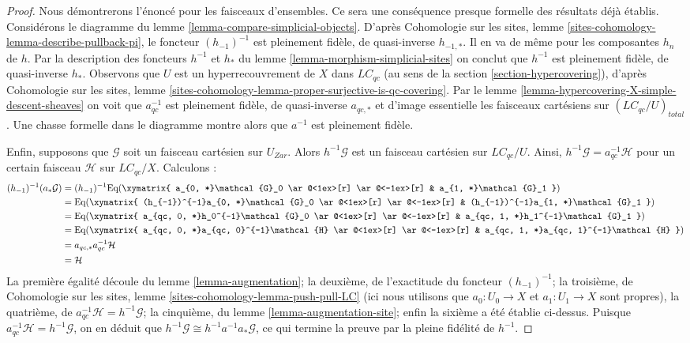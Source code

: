 \begin{proof}
Nous démontrerons l'énoncé pour les faisceaux d'ensembles. Ce sera une
conséquence presque formelle des résultats déjà établis.
Considérons le diagramme du lemme \ref{lemma-compare-simplicial-objects}.
D'après Cohomologie sur les sites, lemme \ref{sites-cohomology-lemma-describe-pullback-pi},
le foncteur $(h_{-1})^{-1}$ est pleinement fidèle, de quasi-inverse $h_{-1, *}$.
Il en va de même pour les composantes $h_n$ de $h$.
Par la description des foncteurs $h^{-1}$ et $h_*$ du lemme
\ref{lemma-morphism-simplicial-sites}
on conclut que $h^{-1}$ est pleinement fidèle, de quasi-inverse $h_*$.
Observons que $U$ est un hyperrecouvrement de $X$ dans $\textit{LC}_{qc}$
(au sens de la section \ref{section-hypercovering}), d'après
Cohomologie sur les sites, lemme
\ref{sites-cohomology-lemma-proper-surjective-is-qc-covering}.
Par le lemme \ref{lemma-hypercovering-X-simple-descent-sheaves}
on voit que $a_{qc}^{-1}$ est pleinement fidèle, de quasi-inverse $a_{qc, *}$
et d'image essentielle les faisceaux cartésiens sur
$(\textit{LC}_{qc}/U)_{total}$.
Une chasse formelle dans le diagramme montre alors que
$a^{-1}$ est pleinement fidèle.

\medskip\noindent
Enfin, supposons que $\mathcal{G}$ soit un faisceau cartésien sur $U_{Zar}$.
Alors $h^{-1}\mathcal{G}$ est un faisceau cartésien sur $\textit{LC}_{qc}/U$.
Ainsi, $h^{-1}\mathcal{G} = a_{qc}^{-1}\mathcal{H}$ pour un certain faisceau
$\mathcal{H}$ sur $\textit{LC}_{qc}/X$.
Calculons :
\begin{align*}
(h_{-1})^{-1}(a_*\mathcal{G})
& =
(h_{-1})^{-1}
\text{Eq}(
\xymatrix{
a_{0, *}\mathcal{G}_0
\ar@<1ex>[r] \ar@<-1ex>[r] &
a_{1, *}\mathcal{G}_1
}
) \\
& =
\text{Eq}(
\xymatrix{
(h_{-1})^{-1}a_{0, *}\mathcal{G}_0
\ar@<1ex>[r] \ar@<-1ex>[r] &
(h_{-1})^{-1}a_{1, *}\mathcal{G}_1
}
) \\
& =
\text{Eq}(
\xymatrix{
a_{qc, 0, *}h_0^{-1}\mathcal{G}_0
\ar@<1ex>[r] \ar@<-1ex>[r] &
a_{qc, 1, *}h_1^{-1}\mathcal{G}_1
}
) \\
& =
\text{Eq}(
\xymatrix{
a_{qc, 0, *}a_{qc, 0}^{-1}\mathcal{H}
\ar@<1ex>[r] \ar@<-1ex>[r] &
a_{qc, 1, *}a_{qc, 1}^{-1}\mathcal{H}
}
) \\
& =
a_{qc, *}a_{qc}^{-1}\mathcal{H} \\
& =
\mathcal{H}
\end{align*}
La première égalité découle du lemme \ref{lemma-augmentation};
la deuxième, de l'exactitude du foncteur $(h_{-1})^{-1}$;
la troisième, de
Cohomologie sur les sites, lemme \ref{sites-cohomology-lemma-push-pull-LC}
(ici nous utilisons que $a_0 : U_0 \to X$ et $a_1: U_1 \to X$ sont propres),
la quatrième, de $a_{qc}^{-1}\mathcal{H} = h^{-1}\mathcal{G}$;
la cinquième, du lemme \ref{lemma-augmentation-site}; enfin la sixième
a été établie ci-dessus. Puisque $a_{qc}^{-1}\mathcal{H} = h^{-1}\mathcal{G}$,
on en déduit que $h^{-1}\mathcal{G} \cong h^{-1}a^{-1}a_*\mathcal{G}$,
ce qui termine la preuve par la pleine fidélité de $h^{-1}$.
\end{proof}

